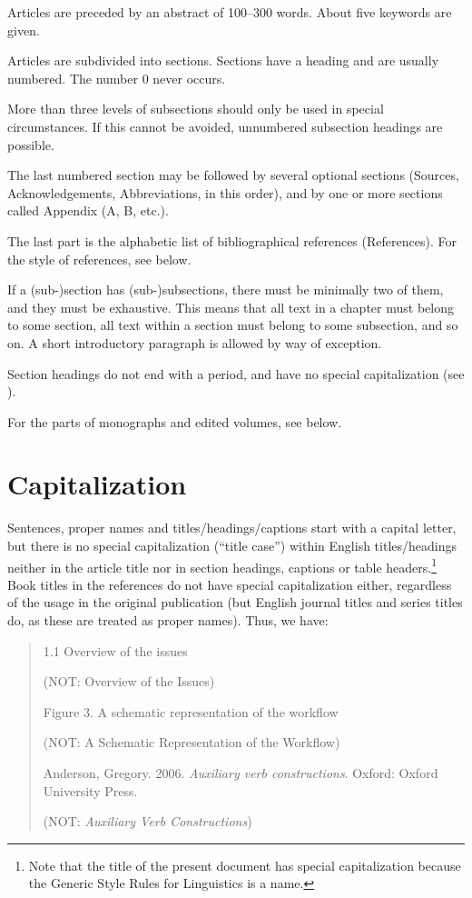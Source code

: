 \documentclass[a4paper]{article}
\newenvironment{gsrexq}{\begin{quote}\color{blue}}{\end{quote}}
\newcommand{\gsrex}[1]{{\color{blue}#1}}
\begin{document}
Articles are preceded by an abstract of 100--300 words. About five keywords are given. 

Articles are subdivided into sections.
Sections have a heading and are usually numbered. The number 0 never
occurs. 

More than three levels of subsections should only be used in
special circumstances. If this cannot be avoided, unnumbered subsection
headings are possible. 

The last numbered section may be followed by
several optional sections (\gsrex{Sources},
\gsrex{Acknowledgements},
\gsrex{Abbreviations},
in this order), and by one or more sections called \gsrex{Appendix} (A, B, etc.).


The last part is the alphabetic list of bibliographical references
(\gsrex{References}). For the style of references, see  below. 

If a
(sub-)section has (sub-)subsections, there must be minimally two of
them, and they must be exhaustive. This means that all text in a chapter
must belong to some section, all text within a section must belong to
some subsection, and so on. A short introductory paragraph is allowed by
way of exception. 

Section headings do not end with a period, and have no
special capitalization (see ). 

For the parts of monographs and edited
volumes, see  below.

\section{Capitalization}\label{sec:capitalization}

Sentences, proper names and titles/headings/captions start with a
capital letter, but there is no special capitalization (``title case'')
within English titles/headings neither in the article title nor in
section headings, captions or table headers.\footnote{Note that the title
of the present document has special capitalization because the Generic
Style Rules for Linguistics is a name.} Book titles in the references
do not have special capitalization either, regardless of the usage in
the original publication (but English journal titles and series titles
do, as these are treated as proper names). Thus, we have:

\begin{gsrexq}
1.1 Overview of the issues 

\qquad (NOT: Overview of the Issues) 

\noindent 
Figure 3. A schematic representation of the workflow 

\qquad (NOT: A Schematic Representation of the Workflow) 

\noindent
Anderson, Gregory. 2006. \textit{Auxiliary verb constructions}. Oxford: Oxford University Press.

\qquad (NOT: \textit{Auxiliary Verb Constructions})
\end{gsrexq}
\end{document}
